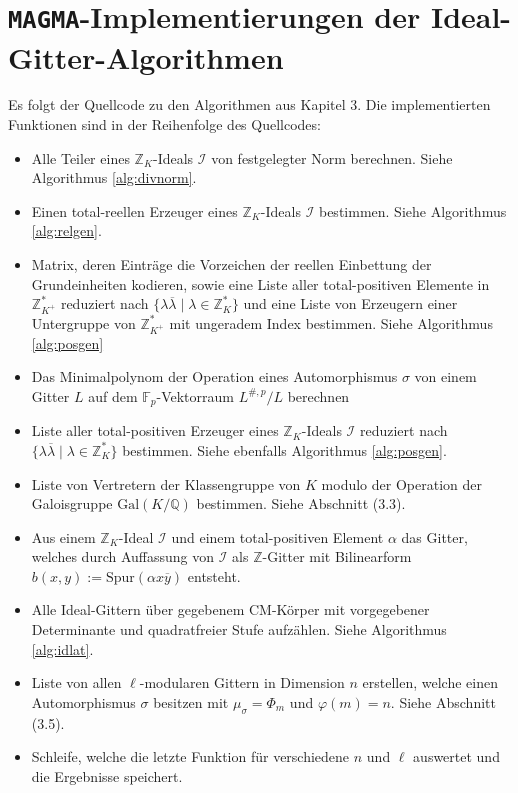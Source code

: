 \documentclass[12pt,a4paper,halfparskip,headsepline,bibtotocnumbered]{scrreprt}
\theoremstyle{nummermitklammern}
\theoremstyle{nonumberbreak}
\newcommand{\Z}{\mathbb{Z}}
\newcommand{\Q}{\mathbb{Q}}
\newcommand{\F}{\mathbb{F}}
\newcommand{\I}{\mathcal{I}}
\begin{document}
\section{\texttt{MAGMA}-Implementierungen der Ideal-Gitter-Algorithmen}
Es folgt der Quellcode zu den Algorithmen aus Kapitel 3. Die implementierten Funktionen sind in der Reihenfolge des Quellcodes:
\begin{itemize}
	\item Alle Teiler eines $\Z_K$-Ideals $\I$ von festgelegter Norm berechnen. Siehe Algorithmus \eqref{alg:divnorm}.
	\item Einen total-reellen Erzeuger eines $\Z_K$-Ideals $\I$ bestimmen. Siehe Algorithmus \eqref{alg:relgen}.
	\item Matrix, deren Einträge die Vorzeichen der reellen Einbettung der Grundeinheiten kodieren, sowie eine Liste aller total-positiven Elemente in $\Z_{K^+}^\ast$ reduziert nach $\lbrace \lambda \overline{\lambda} \mid \lambda \in \Z_K^\ast \rbrace$ und eine Liste von Erzeugern einer Untergruppe von $\Z_{K^+}^\ast$ mit ungeradem Index bestimmen. Siehe Algorithmus \eqref{alg:posgen}
	\item Das Minimalpolynom der Operation eines Automorphismus $\sigma$ von einem Gitter $L$ auf dem $\F_p$-Vektorraum $L^{\#,p}/L$ berechnen
	\item Liste aller total-positiven Erzeuger eines $\Z_K$-Ideals $\I$ reduziert nach $\lbrace \lambda \overline{\lambda} \mid \lambda \in \Z_K^\ast \rbrace$ bestimmen. Siehe ebenfalls Algorithmus \eqref{alg:posgen}.
	\item Liste von Vertretern der Klassengruppe von $K$ modulo der Operation der Galoisgruppe $\text{Gal}(K/\Q)$ bestimmen. Siehe Abschnitt (3.3).
	\item Aus einem $\Z_K$-Ideal $\I$ und einem total-positiven Element $\alpha$ das Gitter, welches durch Auffassung von $\I$ als $\Z$-Gitter mit Bilinearform $b(x,y) := \text{Spur}(\alpha x \overline{y})$ entsteht.
	\item Alle Ideal-Gittern über gegebenem CM-Körper mit vorgegebener Determinante und quadratfreier Stufe aufzählen. Siehe Algorithmus \eqref{alg:idlat}.
	\item Liste von allen $\ell$-modularen Gittern in Dimension $n$ erstellen, welche einen Automorphismus $\sigma$ besitzen mit $\mu_\sigma = \Phi_m$ und $\varphi(m) = n$. Siehe Abschnitt (3.5).
	\item Schleife, welche die letzte Funktion für verschiedene $n$ und $\ell$ auswertet und die Ergebnisse speichert.
\end{itemize}

\end{document}
